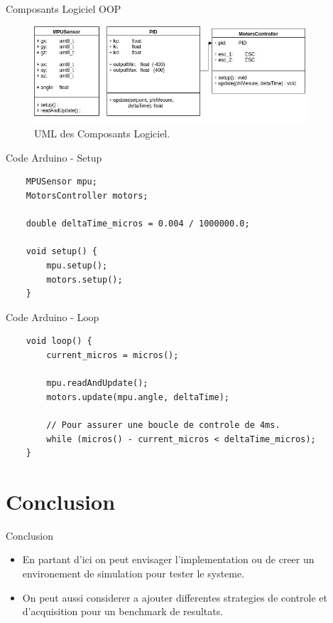 \documentclass{beamer}
\begin{document}
\begin{frame}{Composants Logiciel OOP}
	\begin{figure}
		\centering
		\includegraphics[width=0.9\textwidth]{assets/uml.jpg}
		\caption{UML des Composants Logiciel.}
	\end{figure}
\end{frame}


\begin{frame}[fragile]{Code Arduino - Setup}
	\begin{verbatim}
	MPUSensor mpu;
	MotorsController motors;

	double deltaTime_micros = 0.004 / 1000000.0;

	void setup() {
		mpu.setup();
		motors.setup();
	}
	\end{verbatim}
\end{frame}

\begin{frame}[fragile]{Code Arduino - Loop}
	\begin{verbatim}
	void loop() {
		current_micros = micros();

		mpu.readAndUpdate();
		motors.update(mpu.angle, deltaTime);

		// Pour assurer une boucle de controle de 4ms.
		while (micros() - current_micros < deltaTime_micros);
	}
	\end{verbatim}
\end{frame}

\section{Conclusion}

\begin{frame}{Conclusion}
	\begin{itemize}
		\item En partant d'ici on peut envisager l'implementation ou de creer un environement de simulation pour tester le systeme.
		\item On peut aussi considerer a ajouter differentes strategies de controle et d'acquisition pour un benchmark de resultats.
	\end{itemize}
\end{frame}
\end{document}
